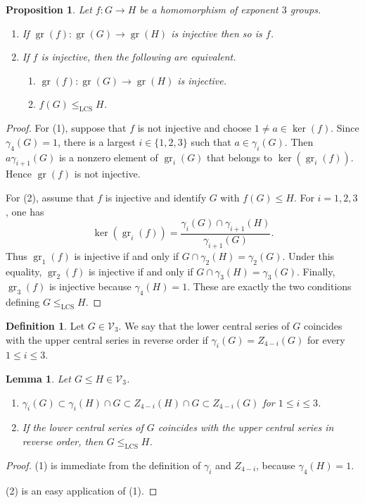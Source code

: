 \documentclass[11pt,reqno]{article}
\newtheorem{lemma}[theorem]{Lemma}
\newtheorem{proposition}[theorem]{Proposition}
\theoremstyle{definition}
\newtheorem{definition}[theorem]{Definition}
\theoremstyle{remark}
\DeclareMathOperator{\gr}{gr}
\newcommand{\LCS}{\mathrm{LCS}}
\begin{document}
\begin{proposition}\label{proposition:gr(f) and LCS}
    Let $f:G\to H$ be a homomorphism of exponent $3$ groups. 
    \begin{enumerate}
        \item If $\gr(f):\gr(G)\to\gr(H)$ is injective then so is $f$.
        \item If $f$ is injective, then the following are equivalent.
        \begin{enumerate}
            \item $\gr(f):\gr(G)\to\gr(H)$ is injective.
            \item $f(G)\leq_{\LCS} H$.
        \end{enumerate}
    \end{enumerate}
\end{proposition}
\begin{proof}
    For (1), suppose that $f$ is not injective and choose $1\neq a\in\ker(f)$.
    Since $\gamma_4(G)=1$, there is a largest $i\in\{1,2,3\}$ such that
    $a\in\gamma_i(G)$.  Then
    $a\gamma_{i+1}(G)$ is a nonzero element of $\gr_i(G)$ that belongs to
    $\ker(\gr_i(f))$.  Hence $\gr(f)$ is not injective.

    For (2), assume that $f$ is injective and identify $G$ with $f(G)\leq H$.
    For $i=1,2,3$, one has
    \[
    \ker(\gr_i(f))
    =
    \frac{\gamma_i(G)\cap\gamma_{i+1}(H)}{\gamma_{i+1}(G)}.
    \]
    Thus $\gr_1(f)$ is injective if and only if
    $G\cap\gamma_2(H)=\gamma_2(G)$.  Under this equality,
    $\gr_2(f)$ is injective if and only if
    $G\cap\gamma_3(H)=\gamma_3(G)$.  Finally, $\gr_3(f)$ is injective because
    $\gamma_4(H)=1$.  These are exactly the two conditions defining
    $G\leq_{\LCS}H$.
\end{proof}

\begin{definition}
    Let $G\in \mathcal V_3$. 
    We say that the lower central series of $G$ coincides with the upper
    central series in reverse order if $\gamma_i(G)=Z_{4-i}(G)$ for every
    $1\leq i\leq 3$.
\end{definition}

\begin{lemma}
    Let $G\leq H\in \mathcal V_3$.
    \begin{enumerate}
        \item $\gamma_i(G)\subset \gamma_i(H)\cap G \subset Z_{4-i}(H)\cap G \subset Z_{4-i}(G)$ for $1\leq i\leq 3$.
        \item If the lower central series of $G$ coincides with the upper
        central series in reverse order, then $G\leq_{\LCS}H$. 
    \end{enumerate}
\end{lemma}
\begin{proof}
    (1) is immediate from the definition of $\gamma_i$ and $Z_{4-i}$, because $\gamma_4(H)=1$.

    (2) is an easy application of (1).
\end{proof}
\end{document}
